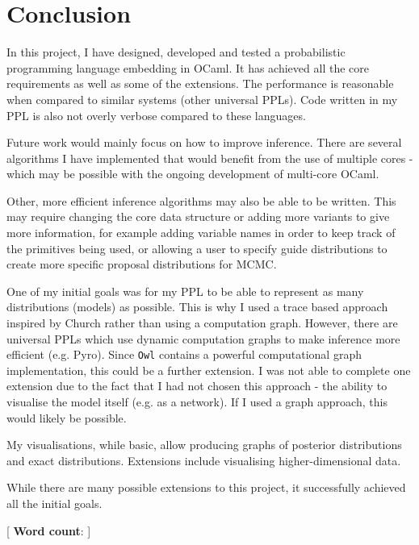 \chapter{Conclusion}

In this project, I have designed, developed and tested a probabilistic programming language embedding in OCaml. It has achieved all the core requirements as well as some of the extensions. The performance is reasonable when compared to similar systems (other universal PPLs). Code written in my PPL is also not overly verbose compared to these languages.

Future work would mainly focus on how to improve inference. There are several algorithms I have implemented that would benefit from the use of multiple cores - which may be possible with the ongoing development of multi-core OCaml. 

Other, more efficient inference algorithms may also be able to be written. This may require changing the core data structure or adding more variants to give more information, for example adding variable names in order to keep track of the primitives being used, or allowing a user to specify guide distributions to create more specific proposal distributions for MCMC.

One of my initial goals was for my PPL to be able to represent as many distributions (models) as possible. This is why I used a trace based approach inspired by Church rather than using a computation graph. However, there are universal PPLs which use dynamic computation graphs to make inference more efficient (e.g. Pyro). Since \texttt{Owl} contains a powerful computational graph implementation, this could be a further extension. I was not able to complete one extension due to the fact that I had not chosen this approach - the ability to visualise the model itself (e.g. as a network). If I used a graph approach, this would likely be possible.

My visualisations, while basic, allow producing graphs of posterior distributions and exact distributions. Extensions include visualising higher-dimensional data.

While there are many possible extensions to this project, it successfully achieved all the initial goals.

\mbox{}
\vfill
[ {\small \textbf{Word count}: }]